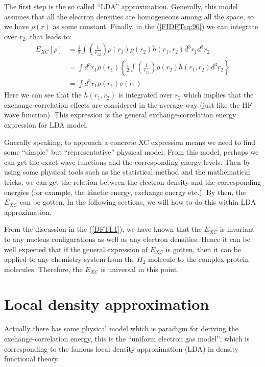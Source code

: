 The first step is the so called ``LDA'' approximation. Generally, 
this model assumes that all the electron densities are homogeneous 
among all the space, so we have $\rho(r)$ as some constant. Finally, 
in the (\ref{FIDFTeq:90}) we can 
integrate over $r_{2}$, that leads to:
\begin{equation}
 \begin{split}
  E_{XC}[\rho] &= \frac{1}{2} \int \left(\frac{1}{r_{12}}\right)
\rho(r_{1})\rho(r_{2})\widetilde{h}(r_{1},
r_{2})d^{3}r_{1}d^{3}r_{2} \\
&= \int d^{3}r_{1} \rho(r_{1}) 
\left\lbrace 
\frac{1}{2}\int  
\left(\frac{1}{r_{12}}\right)\rho(r_{2})\widetilde{h}(r_{1},
r_{2})d^{3}r_{2}
\right\rbrace  \\
&= \int d^{3}r_{1} \rho(r_{1}) v(r_{1})
 \end{split}
 \label{FIDFTeq:91}
\end{equation}
Here we can see that the $\widetilde{h}(r_{1},
r_{2})$ is integrated over $r_{2}$ which implies that the 
exchange-correlation effects are considered in the average way (just like
the HF wave function). This expression is the general exchange-correlation
energy expression for LDA model.

Gnerally speaking, to approach a concrete XC expression means
we need to find some ``simple'' but ``representative'' physical 
model. From this model, perhaps we can get the exact
wave functions and the corresponding energy levels. Then by using
some physical tools such as the statistical method and the
mathematical tricks, we can get the relation between the electron
density and the corresponding energies (for example, the kinetic
energy, exchange energy etc.). By then, the $E_{XC}$ can be gotten.
In the following sections, we will how to do this within LDA 
approximation.

From the discussion in the (\ref{DFTI:1}), we have known that the
$E_{XC}$ is invariant to any nucleus configurations as well as any
electron densities. Hence it can be well expected that if the
general expression of $E_{XC}$ is gotten, then it can be applied to
any chemistry system from the $H_{2}$ molecule to the complex
protein molecules. Therefore, the $E_{XC}$ is universal in this
point.


\section{Local density approximation}
%
%
%
%
Actually there has some physical model which is paradigm for
deriving the exchange-correlation energy, this is the ``uniform
electron gas model''\cite{DFT_PAPERS_GATHERING,
Peter_Fulde_electron_gas}; which is corresponding to the famous
local density approximation (LDA) in density functional theory.


